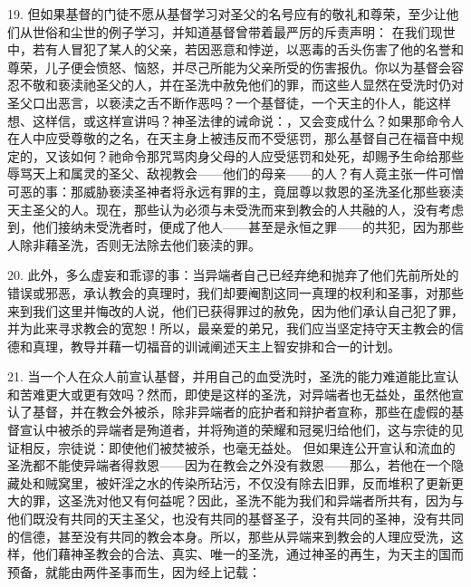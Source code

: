 19. 但如果基督的门徒不愿从基督学习对圣父的名号应有的敬礼和尊荣，至少让他们从世俗和尘世的例子学习，并知道基督曾带着最严厉的斥责声明： 在我们现世中，若有人冒犯了某人的父亲，若因恶意和悖逆，以恶毒的舌头伤害了他的名誉和尊荣，儿子便会愤怒、恼怒，并尽己所能为父亲所受的伤害报仇。你以为基督会容忍不敬和亵渎祂圣父的人，并在圣洗中赦免他们的罪，而这些人显然在受洗时仍对圣父口出恶言，以亵渎之舌不断作恶吗？一个基督徒，一个天主的仆人，能这样想、这样信，或这样宣讲吗？神圣法律的诫命说：，又会变成什么？如果那命令人在人中应受尊敬的之名，在天主身上被违反而不受惩罚，那么基督自己在福音中规定的，又该如何？祂命令那咒骂肉身父母的人应受惩罚和处死，却赐予生命给那些辱骂天上和属灵的圣父、敌视教会——他们的母亲——的人？有人竟主张一件可憎可恶的事：那威胁亵渎圣神者将永远有罪的主，竟屈尊以救恩的圣洗圣化那些亵渎天主圣父的人。现在，那些认为必须与未受洗而来到教会的人共融的人，没有考虑到，他们接纳未受洗者时，便成了他人——甚至是永恒之罪——的共犯，因为那些人除非藉圣洗，否则无法除去他们亵渎的罪。\par

20. 此外，多么虚妄和乖谬的事：当异端者自己已经弃绝和抛弃了他们先前所处的错误或邪恶，承认教会的真理时，我们却要阉割这同一真理的权利和圣事，对那些来到我们这里并悔改的人说，他们已获得罪过的赦免，因为他们承认自己犯了罪，并为此来寻求教会的宽恕！所以，最亲爱的弟兄，我们应当坚定持守天主教会的信德和真理，教导并藉一切福音的训诫阐述天主上智安排和合一的计划。\par

21. 当一个人在众人前宣认基督，并用自己的血受洗时，圣洗的能力难道能比宣认和苦难更大或更有效吗？然而，即使是这样的圣洗，对异端者也无益处，虽然他宣认了基督，并在教会外被杀，除非异端者的庇护者和辩护者宣称，那些在虚假的基督宣认中被杀的异端者是殉道者，并将殉道的荣耀和冠冕归给他们，这与宗徒的见证相反，宗徒说：即使他们被焚被杀，也毫无益处。 但如果连公开宣认和流血的圣洗都不能使异端者得救恩——因为在教会之外没有救恩——那么，若他在一个隐藏处和贼窝里，被奸淫之水的传染所玷污，不仅没有除去旧罪，反而堆积了更新更大的罪，这圣洗对他又有何益呢？因此，圣洗不能为我们和异端者所共有，因为与他们既没有共同的天主圣父，也没有共同的基督圣子，没有共同的圣神，没有共同的信德，甚至没有共同的教会本身。所以，那些从异端来到教会的人理应受洗，这样，他们藉神圣教会的合法、真实、唯一的圣洗，通过神圣的再生，为天主的国而预备，就能由两件圣事而生，因为经上记载：\par

